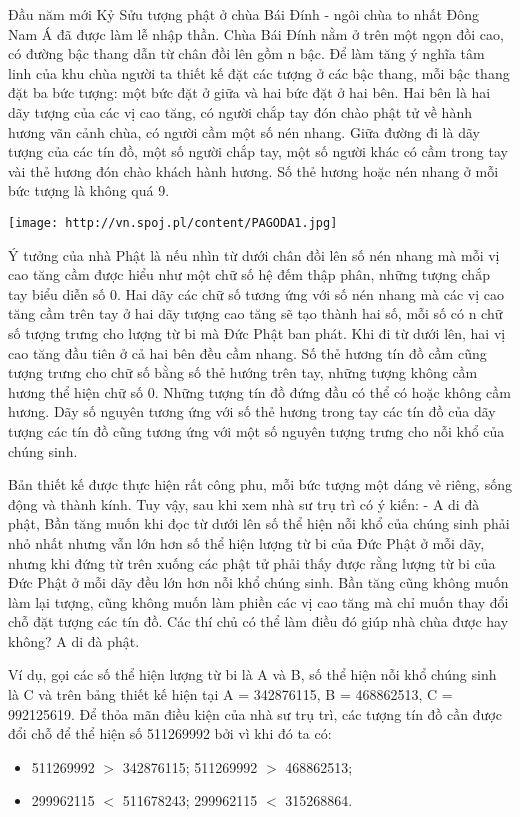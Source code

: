Đầu năm mới Kỷ Sửu tượng phật ở chùa Bái Đính - ngôi chùa to nhất Đông Nam Á đã được làm lễ nhập thần. Chùa Bái Đính nằm ở trên một ngọn đồi cao, có đường bậc thang dẫn từ chân đồi lên gồm n bậc. Để làm tăng ý nghĩa tâm linh của khu chùa người ta thiết kế đặt các tượng ở các bậc thang, mỗi bậc thang đặt ba bức tượng: một bức đặt ở giữa và hai bức đặt ở hai bên. Hai bên là hai dãy tượng của các vị cao tăng, có người chắp tay đón chào phật tử về hành hương vãn cảnh chùa, có người cầm một số nén nhang. Giữa đường đi là dãy tượng của các tín đồ, một số người chắp tay, một số người khác có cầm trong tay vài thẻ hương đón chào khách hành hương. Số thẻ hương hoặc nén nhang ở mỗi bức tượng là không quá 9.


\texttt{[image: http://vn.spoj.pl/content/PAGODA1.jpg]}

Ý tưởng của nhà Phật là nếu nhìn từ dưới chân đồi lên số nén nhang mà mỗi vị cao tăng cầm được hiểu như một chữ số hệ đếm thập phân, những tượng chắp tay biểu diễn số 0. Hai dãy các chữ số tương ứng với số nén nhang mà các vị cao tăng cầm trên tay ở hai dãy tượng cao tăng sẽ tạo thành hai số, mỗi số có n chữ số tượng trưng cho lượng từ bi mà Đức Phật ban phát. Khi đi từ dưới lên, hai vị cao tăng đầu tiên ở cả hai bên đều cầm nhang. Số thẻ hương tín đồ cầm cũng tượng trưng cho chữ số bằng số thẻ hướng trên tay, những tượng không cầm hương thể hiện chữ số 0. Những tượng tín đồ đứng đầu có thể có hoặc không cầm hương. Dãy số nguyên tương ứng với số thẻ hương trong tay các tín đồ của dãy tượng các tín đồ cũng tương ứng với một số nguyên tượng trưng cho nỗi khổ của chúng sinh.





Bản thiết kế được thực hiện rất công phu, mỗi bức tượng một dáng vẻ riêng, sống động và thành kính. Tuy vậy, sau khi xem nhà sư trụ trì có ý kiến: - A di đà phật, Bần tăng muốn khi đọc từ dưới lên số thể hiện nỗi khổ của chúng sinh phải nhỏ nhất nhưng vẫn lớn hơn số thể hiện lượng từ bi của Đức Phật ở mỗi dãy, nhưng khi đứng từ trên xuống các phật tử phải thấy được rằng lượng từ bi của Đức Phật ở mỗi dãy đều lớn hơn nỗi khổ chúng sinh. Bần tăng cũng không muốn làm lại tượng, cũng không muốn làm phiền các vị cao tăng mà chỉ muốn thay đổi chỗ đặt tượng các tín đồ. Các thí chủ có thể làm điều đó giúp nhà chùa được hay không? A di đà phật.


Ví dụ, gọi các số thể hiện lượng từ bi là A và B, số thể hiện nỗi khổ chúng sinh là C và trên bảng thiết kế hiện tại A = 342876115, B = 468862513, C = 992125619. Để thỏa mãn điều kiện của nhà sư trụ trì, các tượng tín đồ cần được đổi chỗ để thể hiện số 511269992 bởi vì khi đó ta có:
\begin{itemize}
	\item 511269992 $>$ 342876115; 511269992 $>$ 468862513;
	\item 299962115 $<$ 511678243; 299962115 $<$ 315268864.
\end{itemize}


